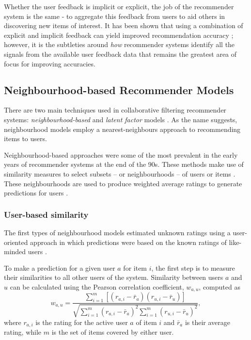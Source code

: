 Whether the user feedback is implicit or explicit, the job of the recommender system is the same - to aggregate this feedback from users to aid others in discovering new items of interest. It has been shown that using a combination of explicit and implicit feedback can yield improved recommendation accuracy \parencite{cf_1.4_comparison}; however, it is the subtleties around \textit{how} recommender systems identify all the signals from the available user feedback data that remains the greatest area of focus for improving accuracies.

\subsection{Neighbourhood-based Recommender Models}
There are two main techniques used in collaborative filtering recommender systems: \textit{neighbourhood-based} and \textit{latent factor} models \parencite{handbook_1.5_cf}. As the name suggests, neighbourhood models employ a nearest-neighbours approach to recommending items to users.

Neighbourhood-based approaches were some of the most prevalent in the early years of recommender systems at the end of the 90s. These methods make use of similarity measures to select subsets -- or neighbourhoods -- of users or items \parencite{cf_1.6_implicit}. These neighbourhoods are used to produce weighted average ratings to generate predictions for users \parencite{herlocker1999algorithmic}.

\subsubsection{User-based similarity}
The first types of neighbourhood models estimated unknown ratings using a user-oriented approach in which predictions were based on the known ratings of like-minded users \parencite{cf_1.6_implicit}.

To make a prediction for a given user $a$ for item $i$, the first step is to measure their similarities to all other users of the system. Similarity between users $a$ and $u$ can be calculated using the Pearson correlation coefficient, $w_{a,u}$, computed as
\begin{equation}
    w_{a,u} = \dfrac{\sum\limits_{i=1}^{m}[(r_{a,i}-\bar{r}_a)(r_{u,i}-\bar{r}_u)]}{\sqrt{\sum\limits_{i=1}^{m}(r_{a,i}-\bar{r}_a)^2\sum\limits_{i=1}^{m}(r_{u,i}-\bar{r}_u)^2}},
\end{equation}
where $r_{a,i}$ is the rating for the active user $a$ of item $i$ and $\bar{r}_a$ is their average rating, while $m$ is the set of items covered by either user.

